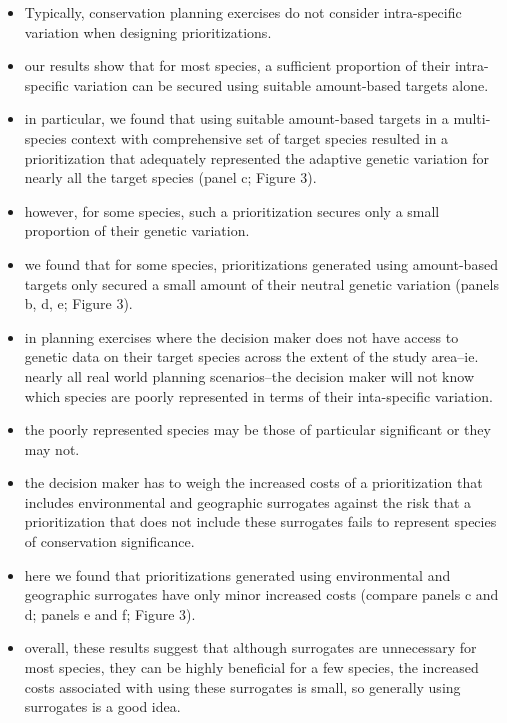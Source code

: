 \documentclass[11pt,]{article}
\providecommand{\tightlist}{%
  \setlength{\itemsep}{0pt}\setlength{\parskip}{0pt}}
\begin{document}
\begin{itemize}
\tightlist
\item
  Typically, conservation planning exercises do not consider
  intra-specific variation when designing prioritizations.
\item
  our results show that for most species, a sufficient proportion of
  their intra-specific variation can be secured using suitable
  amount-based targets alone.
\item
  in particular, we found that using suitable amount-based targets in a
  multi-species context with comprehensive set of target species
  resulted in a prioritization that adequately represented the adaptive
  genetic variation for nearly all the target species (panel c; Figure
  3).
\item
  however, for some species, such a prioritization secures only a small
  proportion of their genetic variation.
\item
  we found that for some species, prioritizations generated using
  amount-based targets only secured a small amount of their neutral
  genetic variation (panels b, d, e; Figure 3).
\item
  in planning exercises where the decision maker does not have access to
  genetic data on their target species across the extent of the study
  area--ie. nearly all real world planning scenarios--the decision maker
  will not know which species are poorly represented in terms of their
  inta-specific variation.
\item
  the poorly represented species may be those of particular significant
  or they may not.
\item
  the decision maker has to weigh the increased costs of a
  prioritization that includes environmental and geographic surrogates
  against the risk that a prioritization that does not include these
  surrogates fails to represent species of conservation significance.
\item
  here we found that prioritizations generated using environmental and
  geographic surrogates have only minor increased costs (compare panels
  c and d; panels e and f; Figure 3).
\item
  overall, these results suggest that although surrogates are
  unnecessary for most species, they can be highly beneficial for a few
  species, the increased costs associated with using these surrogates is
  small, so generally using surrogates is a good idea.
\end{itemize}
\end{document}
